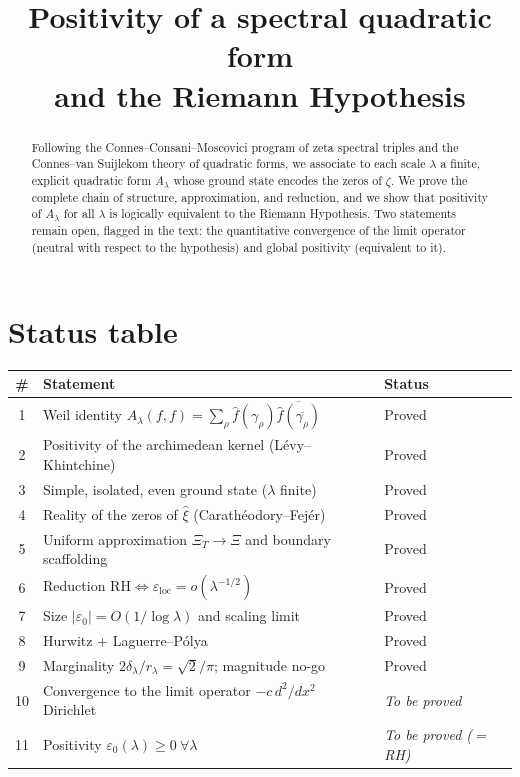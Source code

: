 \documentclass[11pt]{amsart}
\title{Positivity of a spectral quadratic form\\ and the Riemann Hypothesis}
\author{}
\date{}
\theoremstyle{definition}
\theoremstyle{remark}
\newcommand{\ve}{\varepsilon}
\newcommand{\loc}{\mathrm{loc}}
\begin{document}
\maketitle

\begin{abstract}
Following the Connes--Consani--Moscovici program of zeta spectral triples and the
Connes--van Suijlekom theory of quadratic forms, we associate to each scale $\lambda$ a finite,
explicit quadratic form $A_\lambda$ whose ground state encodes the zeros of $\zeta$. We prove
the complete chain of structure, approximation, and reduction, and we show that positivity of
$A_\lambda$ for all $\lambda$ is logically equivalent to the Riemann Hypothesis. Two statements
remain open, flagged in the text: the quantitative convergence of the limit operator (neutral
with respect to the hypothesis) and global positivity (equivalent to it).
\end{abstract}

\section*{Status table}
\begin{center}
\begin{tabular}{cll}
\toprule
\# & Statement & Status \\
\midrule
1 & Weil identity $A_\lambda(f,f)=\sum_\rho \hat f(\gamma_\rho)\overline{\hat f(\overline{\gamma_\rho})}$ & Proved \\
2 & Positivity of the archimedean kernel (Lévy--Khintchine) & Proved \\
3 & Simple, isolated, even ground state ($\lambda$ finite) & Proved \\
4 & Reality of the zeros of $\hat\xi$ (Carathéodory--Fejér) & Proved \\
5 & Uniform approximation $\Xi_T\to\Xi$ and boundary scaffolding & Proved \\
6 & Reduction $\mathrm{RH}\iff \ve_\loc=o(\lambda^{-1/2})$ & Proved \\
7 & Size $|\ve_0|=O(1/\log\lambda)$ and scaling limit & Proved \\
8 & Hurwitz $+$ Laguerre--Pólya & Proved \\
9 & Marginality $2\delta_\lambda/r_\lambda=\sqrt2/\pi$; magnitude no-go & Proved \\
10 & Convergence to the limit operator $-c\,d^2/dx^2$ Dirichlet & \emph{To be proved} \\
11 & Positivity $\ve_0(\lambda)\ge0\ \forall\lambda$ & \emph{To be proved ($=$ RH)} \\
\bottomrule
\end{tabular}
\end{center}
\end{document}
